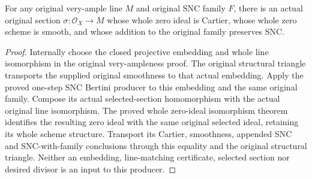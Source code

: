 \begin{lemma}
\label{lem:kn-nadel-bertini-auxiliary-very-ample-section}
\leanok
{}
For any original very-ample line $M$ and original SNC family $F$, there
is an actual original section $\sigma:\mathcal O_X\to M$ whose whole
zero ideal is Cartier, whose whole zero scheme is smooth, and whose
addition to the original family preserves SNC.
\end{lemma}
\begin{proof}
Internally choose the closed projective embedding and whole line
isomorphism in the original very-ampleness proof. The original
structural triangle transports the supplied original smoothness to
that actual embedding. Apply the proved one-step SNC Bertini producer
to this embedding and the same original family. Compose its actual
selected-section homomorphism with the actual original line isomorphism.
The proved whole zero-ideal isomorphism theorem identifies the resulting
zero ideal with the same original selected ideal, retaining its whole
scheme structure. Transport its Cartier, smoothness, appended SNC and
SNC-with-family conclusions through this equality and the original
structural triangle. Neither an embedding, line-matching certificate,
selected section nor desired divisor is an input to this producer.
\end{proof}

